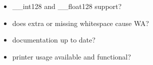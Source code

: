 \begin{itemize}[topsep=0pt,itemsep=0pt,leftmargin=4pt,rightmargin=0pt]
\item \_\_int128 and \_\_float128 support?
\item does extra or missing whitespace cause WA?
\item documentation up to date?
\item printer usage available and functional?
\end{itemize}
